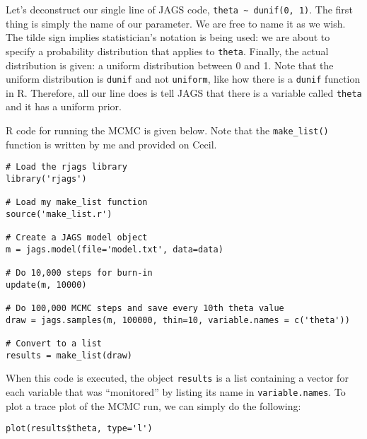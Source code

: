 Let's deconstruct our single line of JAGS code, {\tt theta \~{ } dunif(0, 1)}. The
first thing is simply the name of our parameter. We are free to name it as we
wish. The tilde sign implies statistician's notation is being used: we are
about to specify a probability distribution that applies to {\tt theta}. Finally,
the actual distribution is given: a uniform distribution between 0 and 1. Note
that the uniform distribution is {\tt dunif} and not {\tt uniform}, like how
there is a {\tt dunif} function in R. Therefore, all our line does is tell JAGS
that there is a variable called {\tt theta} and it has a uniform prior.

R code for running the MCMC is given below. Note that the {\tt make\_list()}
function is written by me and provided on Cecil.

\begin{framed}
\begin{verbatim}
# Load the rjags library
library('rjags')

# Load my make_list function
source('make_list.r')

# Create a JAGS model object
m = jags.model(file='model.txt', data=data)

# Do 10,000 steps for burn-in
update(m, 10000)

# Do 100,000 MCMC steps and save every 10th theta value
draw = jags.samples(m, 100000, thin=10, variable.names = c('theta'))

# Convert to a list
results = make_list(draw)
\end{verbatim}
\end{framed}

When this code is executed, the object {\tt results} is a list containing a
vector for each variable that was ``monitored'' by listing its name in
{\tt variable.names}. To plot a trace plot of the MCMC run, we can simply do
the following:
\begin{framed}
\begin{verbatim}
plot(results$theta, type='l')
\end{verbatim}
\end{framed}


